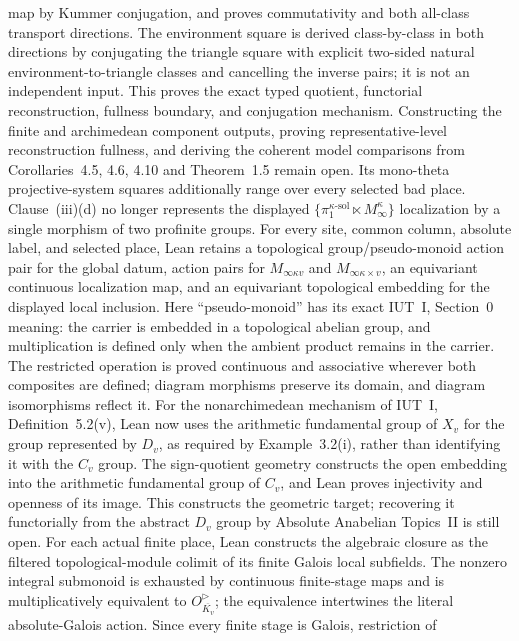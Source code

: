 \documentclass[11pt]{article}
\theoremstyle{plain}
\theoremstyle{definition}
\theoremstyle{remark}
\begin{document}
map by Kummer conjugation, and proves commutativity and both all-class transport
directions.  The environment square is derived class-by-class in both directions by
conjugating the triangle square with explicit two-sided natural
environment-to-triangle classes and cancelling the inverse pairs; it is not an
independent input.
This proves the exact typed quotient, functorial reconstruction, fullness
boundary, and conjugation mechanism.  Constructing the finite and archimedean
component outputs, proving representative-level reconstruction fullness, and
deriving the coherent model comparisons from Corollaries~4.5, 4.6, 4.10 and
Theorem~1.5 remain open.
Its
mono-theta projective-system squares additionally range over every selected
bad place.  Clause~(iii)(d) no longer represents the displayed
\(\{\pi_1^{\kappa\text{-sol}}\ltimes M_\infty^\kappa\}\) localization by a
single morphism of two profinite groups.  For every site, common column,
absolute label, and selected place, Lean retains a topological
group/pseudo-monoid action pair for the global datum, action pairs for
\(M_{\infty\kappa v}\) and \(M_{\infty\kappa\times v}\), an equivariant
continuous localization map, and an equivariant topological embedding for the
displayed local inclusion.
Here ``pseudo-monoid'' has its exact IUT~I, Section~0 meaning: the carrier is
embedded in a topological abelian group, and multiplication is defined only
when the ambient product remains in the carrier.  The restricted operation is
proved continuous and associative wherever both composites are defined;
diagram morphisms preserve its domain, and diagram isomorphisms reflect it.
For the nonarchimedean mechanism of IUT~I, Definition~5.2(v), Lean now
uses the arithmetic fundamental group of \(X_v\) for the group represented by
\(D_v\), as required by Example~3.2(i), rather than identifying it with the
\(C_v\) group.  The sign-quotient geometry constructs the open embedding into
the arithmetic fundamental group of \(C_v\), and Lean proves injectivity and
openness of its image.  This constructs the geometric target; recovering it
functorially from the abstract \(D_v\) group by Absolute Anabelian Topics~II
is still open.  For each actual finite place, Lean constructs the algebraic
closure as the filtered topological-module colimit of its finite Galois local
subfields.  The nonzero integral submonoid is exhausted by continuous
finite-stage maps and is multiplicatively equivalent to
\(O_{\overline{K_v}}^\triangleright\); the equivalence intertwines the literal
absolute-Galois action.  Since every finite stage is Galois, restriction of
\end{document}

